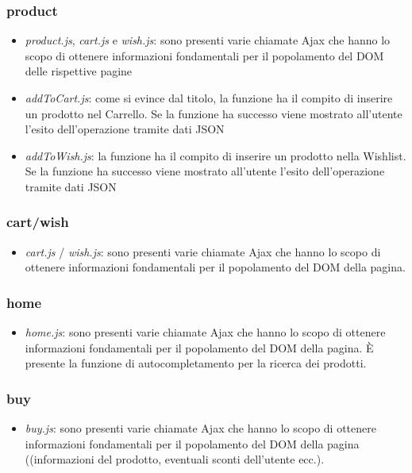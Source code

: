 \documentclass[12pt]{extarticle}
\begin{document}
\subsubsection*{product}
\begin{itemize}
    \item \textit{product.js}, \textit{cart.js} e \textit{wish.js}: sono presenti varie chiamate Ajax che hanno lo scopo di
ottenere informazioni fondamentali per il popolamento del DOM delle rispettive pagine
    \item \textit{addToCart.js}: come si evince dal titolo, la funzione ha il compito di inserire un prodotto nel
Carrello. Se la funzione ha successo viene mostrato all'utente l'esito dell'operazione tramite
dati JSON
    \item \textit{addToWish.js}: la funzione ha il compito di inserire un prodotto nella Wishlist. Se la funzione
ha successo viene mostrato all'utente l'esito dell'operazione tramite dati JSON
\end{itemize}

\subsubsection*{cart/wish}
\begin{itemize}
    \item \textit{cart.js} / \textit{wish.js}: sono presenti varie chiamate Ajax che hanno lo scopo di ottenere
    informazioni fondamentali per il popolamento del DOM della pagina.
\end{itemize}

\subsubsection*{home}
\begin{itemize}
    \item \textit{home.js}: sono presenti varie chiamate Ajax che hanno lo scopo di ottenere informazioni
    fondamentali per il popolamento del DOM della pagina. È presente la funzione di autocompletamento per la ricerca dei prodotti.
\end{itemize}

\subsubsection*{buy}
\begin{itemize}
    \item \textit{buy.js}: sono presenti varie chiamate Ajax che hanno lo scopo di ottenere informazioni
    fondamentali per il popolamento del DOM della pagina ((informazioni del prodotto, eventuali
    sconti dell'utente ecc.).
\end{itemize}
\end{document}
